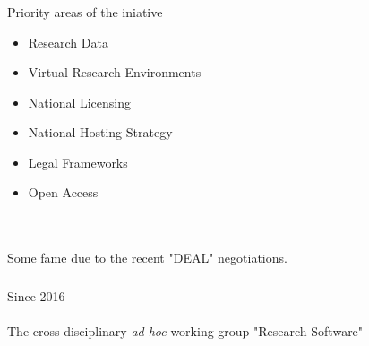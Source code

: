 \documentclass{beamer}
\begin{document}
\begin{frame}
  \frametitle{}
    \begin{block}{}
      \begin{center}
        Priority areas of the iniative\\
        \begin{itemize}
        \item Research Data
        \item Virtual Research Environments
        \item National Licensing
        \item National Hosting Strategy
        \item Legal Frameworks
        \item Open Access
        \end{itemize}
        \ \\ \ \\
        \pause Some fame due to the recent "DEAL" negotiations.
      \end{center}
    \end{block}
\end{frame}

\begin{frame}
  \frametitle{}
    \begin{block}{}
      \begin{center}
        Since 2016\\ \ \\
        The cross-disciplinary \textit{ad-hoc} working group "Research Software"
      \end{center}
    \end{block}
\end{frame}
\end{document}
